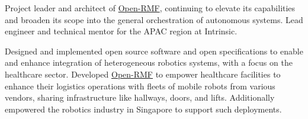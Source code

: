 \documentclass[10pt,a4paper,ragged2e]{altacv}
\begin{document}

\begin{fullwidth}
\makecvheader
\end{fullwidth}



Project leader and architect of \href{https://www.open-rmf.org/}{Open-RMF}, continuing to elevate its capabilities and broaden its scope into the general orchestration of autonomous systems. Lead engineer and technical mentor for the APAC region at Intrinsic.

\divider

Designed and implemented open source software and open specifications to enable and enhance integration of heterogeneous robotics systems, with a focus on the healthcare sector. Developed \href{https://www.open-rmf.org/}{Open-RMF} to empower healthcare facilities to enhance their logistics operations with fleets of mobile robots from various vendors, sharing infrastructure like hallways, doors, and lifts. Additionally empowered the robotics industry in Singapore to support such deployments.

\divider
\end{document}
